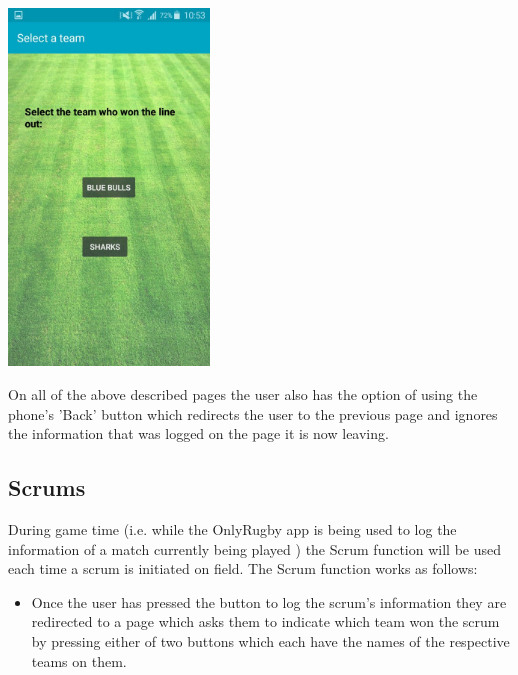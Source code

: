 \documentclass[hidelinks,a4paper,12pt]{article}
\begin{document}
	\begin{center}
  		\includegraphics[width=0.4\textwidth] {./images/choose_lineout.jpg}\\[0.4cm]
	\end{center}

	On all of the above described pages the user also has the option of using the phone's  'Back' button which redirects the user to the previous page and ignores the information that was logged on the page it is now leaving.

\newpage

	\subsection{Scrums}
		During game time (i.e. while the OnlyRugby app is being used to log the information of a match currently being played ) the Scrum function will be used each time a scrum is initiated on field.  The Scrum function works as follows:
		\begin{itemize}
			\item Once the user has pressed the button to log the scrum's information they are redirected to a page which asks them to indicate which
			team won the scrum by pressing either of two buttons which each have the names of the respective teams on them.
		\end{itemize}
\end{document}
